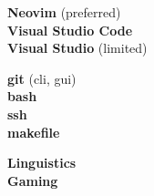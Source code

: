 \documentclass[9pt]{developercv} %
\begin{document}
\bigskip
\begin{minipage}[t]{0.3\textwidth}
	\vspace{-\baselineskip} %


    \textbf{Neovim} (preferred) \\
    \textbf{Visual Studio Code} \\
    \textbf{Visual Studio} (limited) \\
\end{minipage}
\hfill
\begin{minipage}[t]{0.3\textwidth}
	\vspace{-\baselineskip} %
	


    \textbf{git} (cli, gui) \\
    \textbf{bash} \\
    \textbf{ssh} \\
    \textbf{makefile} \\
\end{minipage}
\hfill
\begin{minipage}[t]{0.3\textwidth}
	\vspace{-\baselineskip} %
	
	
    \textbf{Linguistics} \\
    \textbf{Gaming}
\end{minipage}

\end{document}
